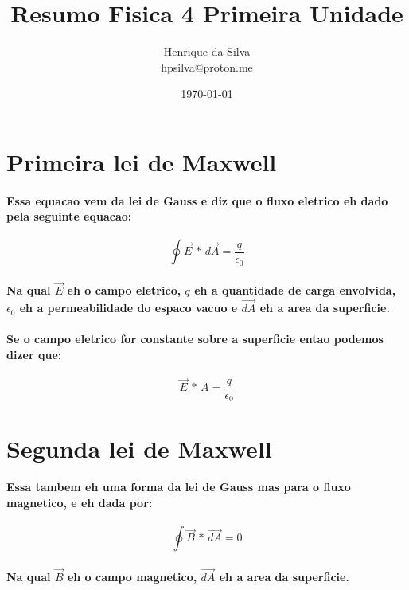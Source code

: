 \documentclass[12pt,twoside, a4paper, twocolumn]{article}
\title{Resumo Fisica 4 Primeira Unidade}
\author{Henrique da Silva \\ hpsilva@proton.me}
\date{\today}
\begin{document}
\maketitle
{}
\newpage
\tableofcontents
\newpage

\newcommand\deriv[2]{\frac{\mathrm d #1}{\mathrm d #2}}

\section{Primeira lei de Maxwell}
\paragraph{Essa equacao vem da lei de Gauss e diz que o fluxo eletrico eh dado pela seguinte equacao:
}
\begin{equation}
    \oint \vec{E} \, * \, \vec{dA} = \frac{q}{\epsilon_0}
\end{equation}
\paragraph*{Na qual $\vec{E}$ eh o campo eletrico, $q$ eh a quantidade de carga envolvida, $\epsilon_0$ eh a permeabilidade do espaco vacuo e $\vec{dA}$ eh a area da superficie.}
\paragraph*{Se o campo eletrico for constante sobre a superficie entao podemos dizer que:}
\begin{equation}
    \vec{E} \, * \, A = \frac{q}{\epsilon_0}
\end{equation}

\section{Segunda lei de Maxwell}
\paragraph*{Essa tambem eh uma forma da lei de Gauss mas para o fluxo magnetico, e eh dada por:}
\begin{equation}
    \oint  \vec{B} \, * \, \vec{dA} = 0
\end{equation}
\paragraph*{Na qual $\vec{B}$ eh o campo magnetico, $\vec{dA}$ eh a area da superficie.}
\end{document}
